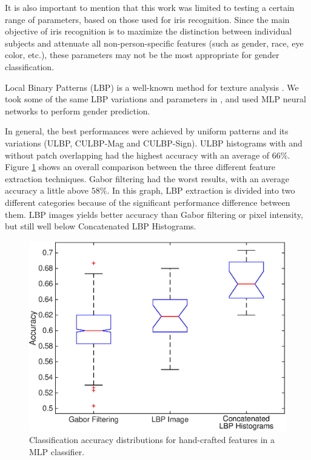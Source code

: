 \documentclass[10pt,twocolumn,letterpaper]{article}
\begin{document}
It is also important to mention that this work was limited to testing a certain range of parameters, based on those used for iris recognition. 
Since the main objective of iris recognition is to maximize the distinction between individual subjects and attenuate all non-person-specific features (such as gender, race, eye color, etc.), these parameters may not be the most appropriate for gender classification. 

Local Binary Patterns (LBP) is a well-known method for texture analysis \cite{Ojala2002,Guo2010}.
We took some of the same LBP variations and parameters in \cite{Tapia2014}, and used MLP neural networks to perform gender prediction.


In general, the best performances were achieved by uniform patterns and its variations (ULBP, CULBP-Mag and CULBP-Sign). 
ULBP histograms with and without patch overlapping had the highest accuracy with an average of $66\%$.
Figure \ref{fig:featext} shows an overall comparison between the three different feature extraction techniques. 
Gabor filtering had the worst results, with an average accuracy a little above $58\%$. 
In this graph, LBP extraction is divided into two different categories because of the significant performance difference between them. 
LBP images yields better accuracy than Gabor filtering or pixel intensity, but still well below Concatenated LBP Histograms.

\begin{figure}[htb]
    \centering
    \includegraphics[width=1\linewidth]{img/figure_feat_extr.eps}
    \caption{Classification accuracy distributions for hand-crafted features in a MLP classifier.}
    \label{fig:featext}
\end{figure}
\end{document}
